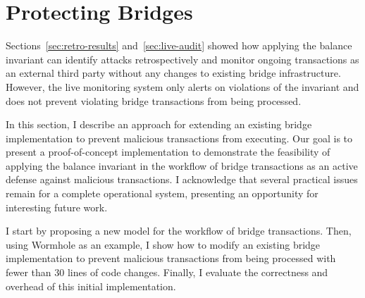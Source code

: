 \section{Protecting Bridges}
\label{sec:active-protect}

Sections~\ref{sec:retro-results} and~\ref{sec:live-audit} showed how
applying the balance invariant can identify attacks retrospectively and
monitor ongoing transactions as an external third party without any
changes to existing bridge infrastructure.  However, the live
monitoring system only alerts on violations of the invariant and does
not prevent violating bridge transactions from being processed.

In this section, I describe an approach for extending an existing
bridge implementation to prevent malicious transactions from
executing.  Our goal is to present a proof-of-concept implementation
to demonstrate the feasibility of applying the balance invariant in the
workflow of bridge transactions as an active defense against malicious
transactions.  I acknowledge that several practical issues remain
for a complete operational system, presenting an opportunity for
interesting future work.




I start by proposing a new model for the workflow of bridge
transactions.  Then, using Wormhole as an example, I show how to
modify an existing bridge implementation to prevent malicious transactions from
being processed with fewer than 30 lines of code changes.  Finally, I
evaluate the correctness and overhead of this initial implementation.

